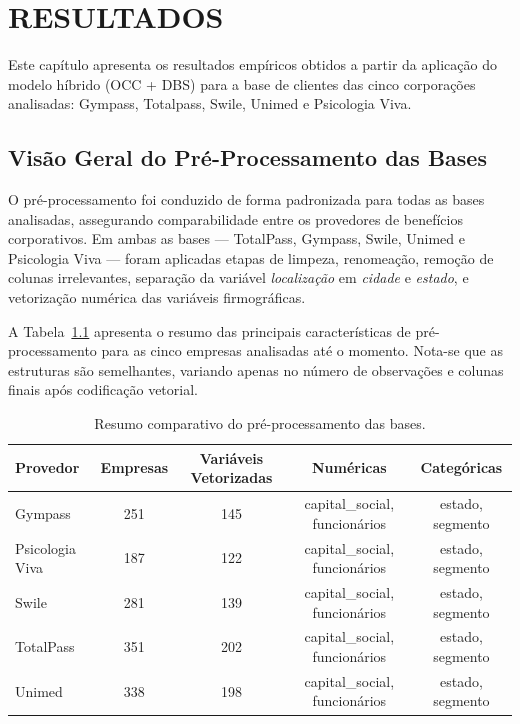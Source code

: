 \chapter{RESULTADOS}

\noindent
Este capítulo apresenta os resultados empíricos obtidos a partir da aplicação do modelo híbrido (OCC + DBS) para a base de clientes das cinco corporações analisadas: Gympass, Totalpass, Swile, Unimed e Psicologia Viva.


\section{Visão Geral do Pré-Processamento das Bases}

O pré-processamento foi conduzido de forma padronizada para todas as bases analisadas, assegurando comparabilidade entre os provedores de benefícios corporativos. Em ambas as bases — TotalPass, Gympass, Swile, Unimed e Psicologia Viva — foram aplicadas etapas de limpeza, renomeação, remoção de colunas irrelevantes, separação da variável \textit{localização} em \textit{cidade} e \textit{estado}, e vetorização numérica das variáveis firmográficas.

A Tabela~\ref{tab:7_1_pre_all} apresenta o resumo das principais características de pré-processamento para as cinco empresas analisadas até o momento. Nota-se que as estruturas são semelhantes, variando apenas no número de observações e colunas finais após codificação vetorial.

\begin{table}[H]
\centering
\caption{Resumo comparativo do pré-processamento das bases.}
\label{tab:7_1_pre_all}
\begin{tabular}{lcccc}
\toprule
\textbf{Provedor} & \textbf{Empresas} & \textbf{Variáveis Vetorizadas} & \textbf{Numéricas} & \textbf{Categóricas} \\
\midrule
Gympass & 251 & 145 & capital\_social, funcionários & estado, segmento \\
Psicologia Viva & 187 & 122 & capital\_social, funcionários & estado, segmento \\
Swile & 281 & 139 & capital\_social, funcionários & estado, segmento \\
TotalPass & 351 & 202 & capital\_social, funcionários & estado, segmento \\
Unimed & 338 & 198 & capital\_social, funcionários & estado, segmento \\
\bottomrule
\end{tabular}
\end{table}

